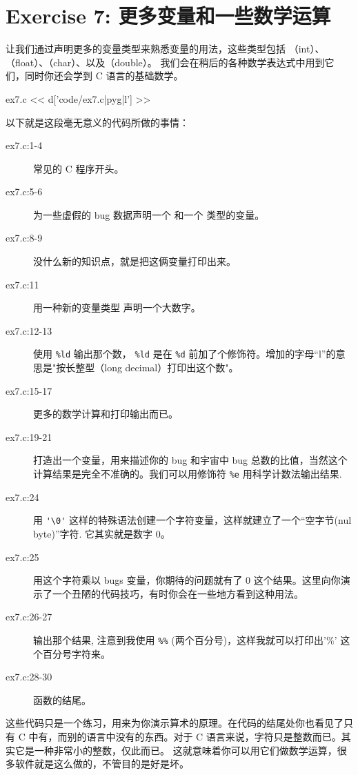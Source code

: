 \chapter{Exercise 7: 更多变量和一些数学运算}

让我们通过声明更多的变量类型来熟悉变量的用法，这些类型包括 （int）、（float）、（char）、以及（double）。 我们会在稍后的各种数学表达式中用到它们，同时你还会学到 C 语言的基础数学。

\begin{code}{ex7.c}
<< d['code/ex7.c|pyg|l'] >>
\end{code}

以下就是这段毫无意义的代码所做的事情：

\begin{description}
\item[ex7.c:1-4] 常见的 C 程序开头。
\item[ex7.c:5-6] 为一些虚假的 bug 数据声明一个  和一个  类型的变量。
\item[ex7.c:8-9] 没什么新的知识点，就是把这俩变量打印出来。
\item[ex7.c:11] 用一种新的变量类型  声明一个大数字。
\item[ex7.c:12-13] 使用 \verb|%ld| 输出那个数， \verb|%ld| 是在 \verb|%d| 前加了个修饰符。增加的字母“l”的意思是"按长整型（long decimal）打印出这个数"。
\item[ex7.c:15-17] 更多的数学计算和打印输出而已。
\item[ex7.c:19-21] 打造出一个变量，用来描述你的 bug 和宇宙中 bug 总数的比值，当然这个计算结果是完全不准确的。我们可以用修饰符 \verb|%e|  用科学计数法输出结果.
\item[ex7.c:24] 用 \verb|'\0'| 这样的特殊语法创建一个字符变量，这样就建立了一个“空字节(nul byte)”字符.  它其实就是数字 0。
\item[ex7.c:25] 用这个字符乘以 bugs 变量，你期待的问题就有了 0 这个结果。这里向你演示了一个丑陋的代码技巧，有时你会在一些地方看到这种用法。
\item[ex7.c:26-27] 输出那个结果, 注意到我使用 \verb|%%| (两个百分号)，这样我就可以打印出'\%' 这个百分号字符来。
\item[ex7.c:28-30]  函数的结尾。
\end{description}

这些代码只是一个练习，用来为你演示算术的原理。在代码的结尾处你也看见了只有 C 中有，而别的语言中没有的东西。对于 C 语言来说，字符只是整数而已。其实它是一种非常小的整数，仅此而已。 这就意味着你可以用它们做数学运算，很多软件就是这么做的，不管目的是好是坏。

